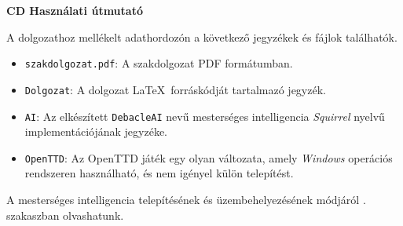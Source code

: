 \pagestyle{empty}

\noindent \textbf{\Large CD Használati útmutató}

\vskip 1cm

\noindent A dolgozathoz mellékelt adathordozón a következő jegyzékek és fájlok találhatók.
\begin{itemize}
	\item \texttt{szakdolgozat.pdf}: A szakdolgozat PDF formátumban.
	\item \texttt{Dolgozat}: A dolgozat \LaTeX\ forráskódját tartalmazó jegyzék.
	\item \texttt{AI}: Az elkészített \texttt{DebacleAI} nevű mesterséges intelligencia \textit{Squirrel} nyelvű implementációjának jegyzéke.
	\item \texttt{OpenTTD}: Az OpenTTD játék egy olyan változata, amely \textit{Windows} operációs rendszeren használható, és nem igényel külön telepítést.
\end{itemize}
A mesterséges intelligencia telepítésének és üzembehelyezésének módjáról . szakaszban olvashatunk.
